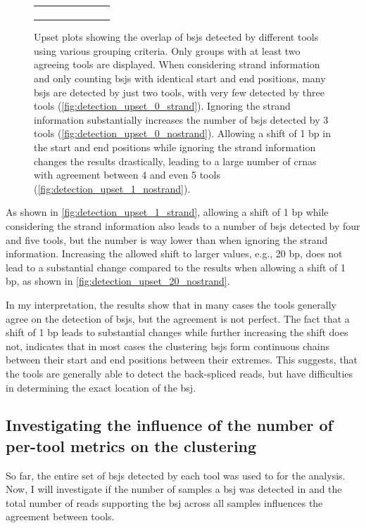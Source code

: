 \begin{figure}[ht]
\begin{tabular}{cc}
{\begin{subfigure}{\textwidth}
                       \end{subfigure}}\end{tabular} \caption{Upset plots
        showing the overlap of
        \gls{bsj}s detected by different tools using various grouping criteria.
        Only groups with at least two agreeing tools are displayed.
        When considering strand information and only counting \gls{bsj}s with identical
        start and end positions, many \gls{bsj}s are detected by just two tools, with
        very few detected by three tools (\cref{fig:detection_upset_0_strand}).
        Ignoring the strand information substantially increases the number of
        \gls{bsj}s detected by 3 tools (\cref{fig:detection_upset_0_nostrand}).
        Allowing a shift of 1 bp in the start and end positions while ignoring the
        strand information changes the results drastically, leading to a large number
        of \gls{crna}s with agreement between 4 and even 5 tools
        (\cref{fig:detection_upset_1_nostrand}).
    }
    \label{fig:detection_upset}
\end{figure}

As shown in \cref{fig:detection_upset_1_strand}, allowing a shift of 1 bp while
considering the strand information also leads to a number of \gls{bsj}s
detected by four and five tools, but the number is way lower than when ignoring
the strand information.
Increasing the allowed shift to larger values, e.g., 20 bp, does not lead to a
substantial change compared to the results when allowing a shift of 1 bp, as
shown in \cref{fig:detection_upset_20_nostrand}.

In my interpretation, the results show that in many cases the tools generally
agree on the detection of \gls{bsj}s, but the agreement is not perfect.
The fact that a shift of 1 bp leads to substantial changes while further
increasing the shift does not, indicates that in most cases the clustering
\gls{bsj}s form continuous chains between their start and end positions between
their extremes.
This suggests, that the tools are generally able to detect the back-spliced
reads, but have difficulties in determining the exact location of the
\gls{bsj}.

\subsection{Investigating the influence of the number of per-tool metrics on
    the clustering}

So far, the entire set of \gls{bsj}s detected by each tool was used to for the
analysis.
Now, I will investigate if the number of samples a \gls{bsj} was detected in
and the total number of reads supporting the \gls{bsj} across all samples
influences the agreement between tools.

